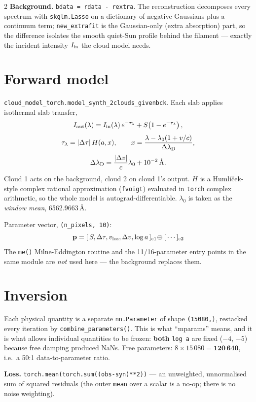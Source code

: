 \documentclass[9pt,a4paper]{article}
\newcommand{\co}[1]{{\small\texttt{#1}}}
\begin{document}
\begin{multicols}{2}
\textbf{Background.} \co{bdata = rdata - rextra}. The reconstruction decomposes every spectrum with \co{skglm.Lasso} on a dictionary of negative Gaussians plus a continuum term; \co{new\_extrafit} is the Gaussian-only (extra absorption) part, so the difference isolates the smooth quiet-Sun profile behind the filament --- exactly the incident intensity $I_{\rm in}$ the cloud model needs.

\section{Forward model}

\co{cloud\_model\_torch.model\_synth\_2clouds\_givenbck}. Each slab applies isothermal slab transfer,
\[
I_{\rm out}(\lambda)=I_{\rm in}(\lambda)\,e^{-\tau_\lambda}+S\!\left(1-e^{-\tau_\lambda}\right),
\]
\[
\tau_\lambda=|\Delta\tau|\,H(a,x),\qquad
x=\frac{\lambda-\lambda_0\!\left(1+v/c\right)}{\Delta\lambda_{\rm D}},
\]
\[
\Delta\lambda_{\rm D}=\frac{|\Delta v|}{c}\lambda_0+10^{-2}\,\text{\AA}.
\]
Cloud 1 acts on the background, cloud 2 on cloud 1's output. $H$ is a Humlí\v{c}ek-style complex rational approximation (\co{fvoigt}) evaluated in \co{torch} complex arithmetic, so the whole model is autograd-differentiable. $\lambda_0$ is taken as the \emph{window mean}, 6562.9663\,\AA.

Parameter vector, \co{(n\_pixels, 10)}:
\[
\mathbf{p}=[\,S,\Delta\tau,v_{\rm los},\Delta v,\log a\,]_{\rm c1}\!\oplus[\,\cdots\,]_{\rm c2}
\]
The \co{me()} Milne-Eddington routine and the 11/16-parameter entry points in the same module are \emph{not} used here --- the background replaces them.

\section{Inversion}

Each physical quantity is a separate \co{nn.Parameter} of shape \co{(15080,)}, restacked every iteration by \co{combine\_parameters()}. This is what ``mparams'' means, and it is what allows individual quantities to be frozen: \textbf{both} \co{log a} are fixed ($-4$, $-5$) because free damping produced NaNs. Free parameters: $8\times15\,080=\mathbf{120\,640}$, i.e.\ a 50:1 data-to-parameter ratio.

\textbf{Loss.} \co{torch.mean(\allowbreak torch.sum(\allowbreak (obs-syn)**2))} --- an unweighted, unnormalised sum of squared residuals (the outer \co{mean} over a scalar is a no-op; there is no noise weighting).


\end{multicols}
\end{document}
